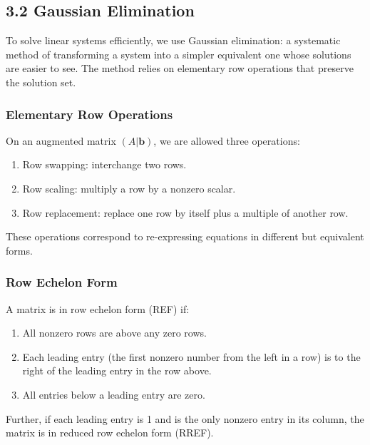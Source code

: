 \documentclass[
  12pt,
  a4paper,
]{article}
\begin{document}
\subsection{3.2 Gaussian Elimination}\label{32-gaussian-elimination}

To solve linear systems efficiently, we use Gaussian elimination: a
systematic method of transforming a system into a simpler equivalent one
whose solutions are easier to see. The method relies on elementary row
operations that preserve the solution set.

\subsubsection{Elementary Row
Operations}\label{elementary-row-operations}

On an augmented matrix \((A|\mathbf{b})\), we are allowed three
operations:

\begin{enumerate}
\def\labelenumi{\arabic{enumi}.}
\item
  Row swapping: interchange two rows.
\item
  Row scaling: multiply a row by a nonzero scalar.
\item
  Row replacement: replace one row by itself plus a multiple of another
  row.
\end{enumerate}

These operations correspond to re-expressing equations in different but
equivalent forms.

\subsubsection{Row Echelon Form}\label{row-echelon-form}

A matrix is in row echelon form (REF) if:

\begin{enumerate}
\def\labelenumi{\arabic{enumi}.}
\item
  All nonzero rows are above any zero rows.
\item
  Each leading entry (the first nonzero number from the left in a row)
  is to the right of the leading entry in the row above.
\item
  All entries below a leading entry are zero.
\end{enumerate}

Further, if each leading entry is 1 and is the only nonzero entry in its
column, the matrix is in reduced row echelon form (RREF).
\end{document}

